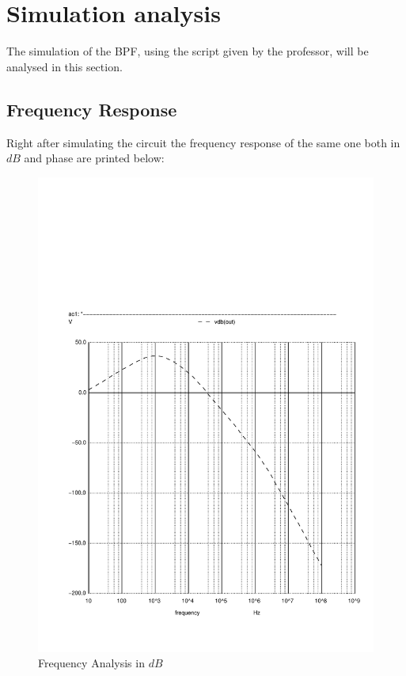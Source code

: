 \section{Simulation analysis}
\label{sec:simulation}
The simulation of the BPF, using the script given by the professor, will be analysed in this section.

\subsection{Frequency Response}
Right after simulating the circuit the frequency response of the same one both in $dB$ and phase are printed below:

\begin{figure}[H] \centering
\includegraphics[width=0.7\linewidth]{../sim/vo1f.pdf}
\caption{Frequency Analysis in $dB$}
\label{fig:frequency1}
\end{figure}

